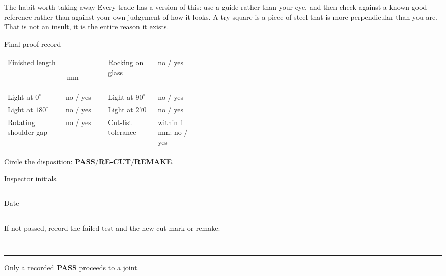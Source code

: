 \begin{telospanel}{The habit worth taking away}
Every trade has a version of this: use a guide rather than your eye, and then
check against a known-good reference rather than against your own judgement of
how it looks. A try square is a piece of steel that is more perpendicular than
you are. That is not an insult, it is the entire reason it exists.
\end{telospanel}

\begin{telospanel}{Final proof record}
\renewcommand{\arraystretch}{1.32}
\begin{tabularx}{\linewidth}{@{}L p{0.22\linewidth} L p{0.22\linewidth}@{}}
Finished length & \rule{18mm}{0.2pt}\,mm
  & Rocking on glass & no \quad / \quad yes\\
Light at $0^\circ$ & no \quad / \quad yes
  & Light at $90^\circ$ & no \quad / \quad yes\\
Light at $180^\circ$ & no \quad / \quad yes
  & Light at $270^\circ$ & no \quad / \quad yes\\
Rotating shoulder gap & no \quad / \quad yes
  & Cut-list tolerance & within 1\,mm: no / yes\\
\end{tabularx}

\medskip
\noindent
Circle the disposition:
\quad\textbf{PASS}\quad/\quad\textbf{RE-CUT}\quad/\quad\textbf{REMAKE}.

\medskip
\noindent
Inspector initials \rule{24mm}{0.2pt}
\hfill Date \rule{28mm}{0.2pt}

\medskip
\noindent
If not passed, record the failed test and the new cut mark or remake:

\smallskip
\noindent
\rule{\linewidth}{0.2pt}

\medskip
\noindent
\rule{\linewidth}{0.2pt}

\medskip
\noindent
\rule{\linewidth}{0.2pt}

\smallskip
\noindent
Only a recorded \textbf{PASS} proceeds to a joint.
\end{telospanel}



